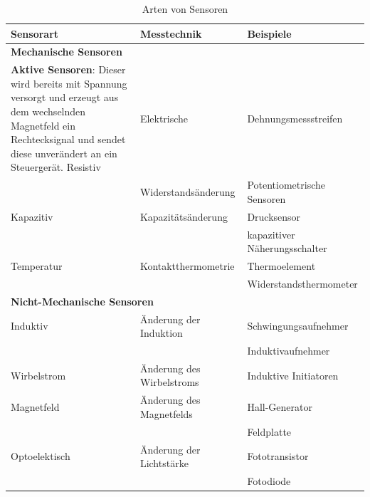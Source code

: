 	        \begin{table}[h]
	        \begin{tabularx}{\textwidth}{l|l|l}
	
	                    \textbf{Sensorart} & \textbf{Messtechnik} & \textbf{Beispiele}\\
						\hline
	                    \multicolumn{3}{l}{\textbf{Mechanische Sensoren}}\\
	                    \hline		           \textbf{Aktive Sensoren}: Dieser wird bereits mit Spannung versorgt und erzeugt aus dem wechselnden Magnetfeld ein Rechtecksignal und sendet diese unverändert an ein Steuergerät.
						Resistiv & Elektrische & Dehnungsmessstreifen \\
						&Widerstandsänderung& Potentiometrische Sensoren\\
						\hline
	                    
	                    Kapazitiv & Kapazitätsänderung & Drucksensor\\
	                    && kapazitiver Näherungsschalter \\
						\hline
						
						Temperatur & Kontaktthermometrie & Thermoelement\\
						&& Widerstandsthermometer \\
	                    \hline
	
	                    \multicolumn{3}{l}{\textbf{Nicht-Mechanische Sensoren}}\\
	                    \hline
	
	                    Induktiv & Änderung der Induktion & Schwingungsaufnehmer \\
	                    && Induktivaufnehmer\\
	                    \hline
									
	                    Wirbelstrom & Änderung des Wirbelstroms & Induktive Initiatoren\\
	                    \hline
	                    
	                    Magnetfeld & Änderung des Magnetfelds & Hall-Generator\\
	                    && Feldplatte\\
	                    \hline
	
	                    Optoelektisch & Änderung der Lichtstärke & Fototransistor\\
	                    && Fotodiode\\
	                    
	
	                \end{tabularx}\\
	                \caption{Arten von Sensoren}
	                \label{fig:TS09}
	            \end{table}
	         	
